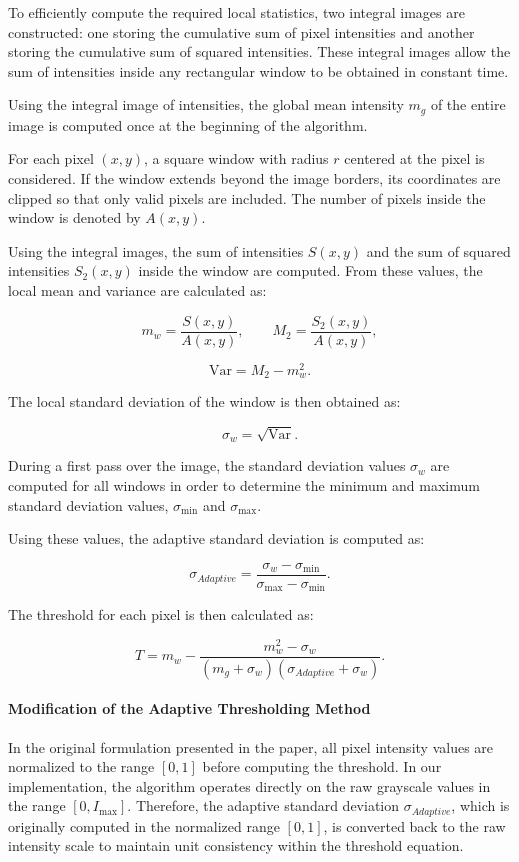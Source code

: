 To efficiently compute the required local statistics, two integral
images are constructed: one storing the cumulative sum of pixel
intensities and another storing the cumulative sum of squared
intensities. These integral images allow the sum of intensities inside
any rectangular window to be obtained in constant time.

Using the integral image of intensities, the global mean intensity
$m_g$ of the entire image is computed once at the beginning of the
algorithm.

For each pixel $(x,y)$, a square window with radius $r$ centered at the
pixel is considered. If the window extends beyond the image borders,
its coordinates are clipped so that only valid pixels are included.
The number of pixels inside the window is denoted by $A(x,y)$.

Using the integral images, the sum of intensities $S(x,y)$ and the sum
of squared intensities $S_2(x,y)$ inside the window are computed.
From these values, the local mean and variance are calculated as:

\[
m_w = \frac{S(x,y)}{A(x,y)}, \qquad
M_2 = \frac{S_2(x,y)}{A(x,y)},
\]

\[
\mathrm{Var} = M_2 - m_w^2.
\]

The local standard deviation of the window is then obtained as:

\[
\sigma_w = \sqrt{\mathrm{Var}}.
\]

During a first pass over the image, the standard deviation values
$\sigma_w$ are computed for all windows in order to determine the
minimum and maximum standard deviation values,
$\sigma_{\min}$ and $\sigma_{\max}$.

Using these values, the adaptive standard deviation is computed as:

\[
\sigma_{Adaptive} =
\frac{\sigma_w - \sigma_{\min}}
{\sigma_{\max} - \sigma_{\min}}.
\]

The threshold for each pixel is then calculated as:

\[
T = m_w -
\frac{m_w^2 - \sigma_w}
{(m_g + \sigma_w)(\sigma_{Adaptive} + \sigma_w)}.
\]

\paragraph{Modification of the Adaptive Thresholding Method}

In the original formulation presented in the paper, all pixel
intensity values are normalized to the range $[0,1]$ before computing
the threshold. In our implementation, the algorithm operates directly
on the raw grayscale values in the range $[0, I_{\text{max}}]$.
Therefore, the adaptive standard deviation $\sigma_{Adaptive}$,
which is originally computed in the normalized range $[0,1]$, is
converted back to the raw intensity scale to maintain unit consistency
within the threshold equation.

